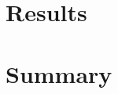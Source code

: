 \documentclass[letterpaper,11pt]{article}
\begin{document}
\section{Results}
\label{sec:results}

\section{Summary}
\label{sec:summary}

\clearpage

\end{document}
